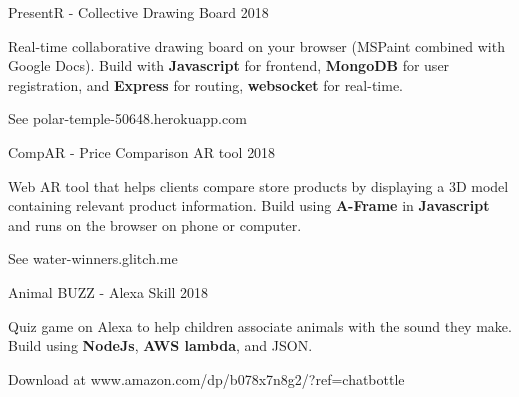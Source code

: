 

\begin{cventries}

  \cventry
    {PresentR - Collective Drawing Board} %
    {} %
    {} %
    {2018} %
    {
      \begin{cvitems} %
        \item {Real-time collaborative drawing board on your browser (MSPaint combined with Google Docs). Build with \textbf{Javascript} for frontend, \textbf{MongoDB} for user registration, and \textbf{Express} for routing, \textbf{websocket} for real-time.}
        \item {See polar-temple-50648.herokuapp.com}
      \end{cvitems}
    }

  \cventry
    {CompAR - Price Comparison AR tool} %
    {} %
    {} %
    {2018} %
    {
      \begin{cvitems} %
        \item {Web AR tool that helps clients compare store products by displaying a 3D model containing relevant product information. Build using \textbf{A-Frame} in \textbf{Javascript} and runs on the browser on phone or computer.}
        \item {See water-winners.glitch.me}
      \end{cvitems}
    }

  \cventry
    {Animal BUZZ - Alexa Skill} %
    {} %
    {} %
    {2018} %
    {
      \begin{cvitems} %
        \item {Quiz game on Alexa to help children associate animals with the sound they make. Build using \textbf{NodeJs}, \textbf{AWS lambda}, and JSON.}
        \item {Download at www.amazon.com/dp/b078x7n8g2/?ref=chatbottle}
      \end{cvitems}
    }


\end{cventries}
